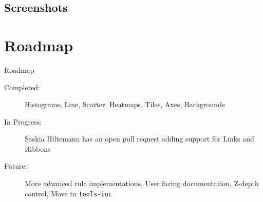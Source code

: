 \documentclass[12pt]{beamer} %
\begin{document}
\subsection{Screenshots}
{
  \begin{frame}[plain]
  \end{frame}
}


\section{Roadmap}
\begin{frame}{Roadmap}
    \begin{description}
        \item[Completed:] Histograms, Line, Scatter, Heatmaps, Tiles, Axes, Backgrounds
        \item[In Progress:] Saskia Hiltemann has an open pull request adding support for Links and Ribbons
        \item[Future:] More advanced rule implementations, User facing documentation, Z-depth control, Move to \texttt{tools-iuc}
    \end{description}
\end{frame}
\end{document}
